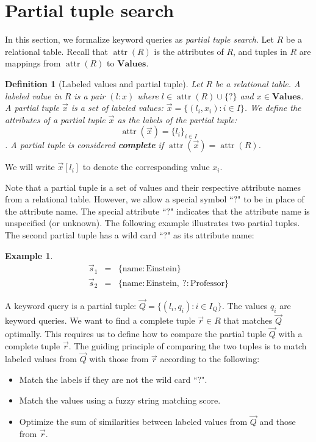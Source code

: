 \documentclass[conference]{IEEEtran}
\newtheorem{definition}{Definition}
\newtheorem{example}{Example}
\newcommand{\Attr}{\operatorname{attr}}
\newcommand{\Values}{\mathbf{Values}}
\begin{document}
\section{Partial tuple search}
In this section, we formalize keyword queries as {\em partial tuple search}.
Let $R$ be a relational table.  Recall that $\Attr(R)$ is the attributes of $R$, and tuples in $R$ are mappings from $\Attr(R)$ to $\Values$.

\begin{definition}[Labeled values and partial tuple]
Let $R$ be a relational table.  A labeled value in $R$ is a pair $(l:x)$ where 
$l\in\Attr(R)\cup\{?\}$ and $x\in\Values$.  A partial tuple $\vec{x}$ is a set
of labeled values: $\vec x = \{(l_i, x_i): i\in I\}$.  We define the
attributes of a partial tuple $\vec x$ as the labels of the partial
tuple:
$$\Attr(\vec x) = \{l_i\}_{i\in I}$$.
A partial tuple is considered {\bf\em complete} if $\Attr(\vec x) = \Attr(R)$.
\end{definition}

We will write $\vec x[l_i]$ to denote the corresponding value $x_i$.

Note that a partial tuple is a set of values and their respective attribute
names from a relational table.  However, we allow a special symbol ``$?$" to be
in place of the attribute name.  The special attribute ``$?$" indicates that
the attribute name is unspecified (or unknown). The following example
illustrates two partial tuples. The second partial tuple has a wild card ``?"
as its attribute name:

\begin{example}
\begin{eqnarray*}
\vec s_1 &=& \{\mathrm{name}:\mathrm{Einstein}\} \\
\vec s_2 &=& \{\mathrm{name}:\mathrm{Einstein},\ \mathrm{?}: \mathrm{Professor}\}
\end{eqnarray*}
\end{example}

A keyword query is a partial tuple: $\vec Q = \{(l_i, q_i): i\in I_Q\}$.  The
values $q_i$ are keyword queries.
We want to find a complete tuple $\vec r \in R$ that matches $\vec Q$
optimally.  This requires us to define how to compare the partial tuple $\vec
Q$ with a complete tuple $\vec r$.  The guiding principle of comparing the two
tuples is to match labeled values from $\vec Q$ with those from $\vec r$
according to the following:
\begin{itemize}
    \item Match the labels if they are not the wild card ``$?$".
    \item Match the values using a fuzzy string matching score.
    \item Optimize the sum of similarities between labeled values from $\vec Q$ and those from $\vec r$.
\end{itemize}
\end{document}
